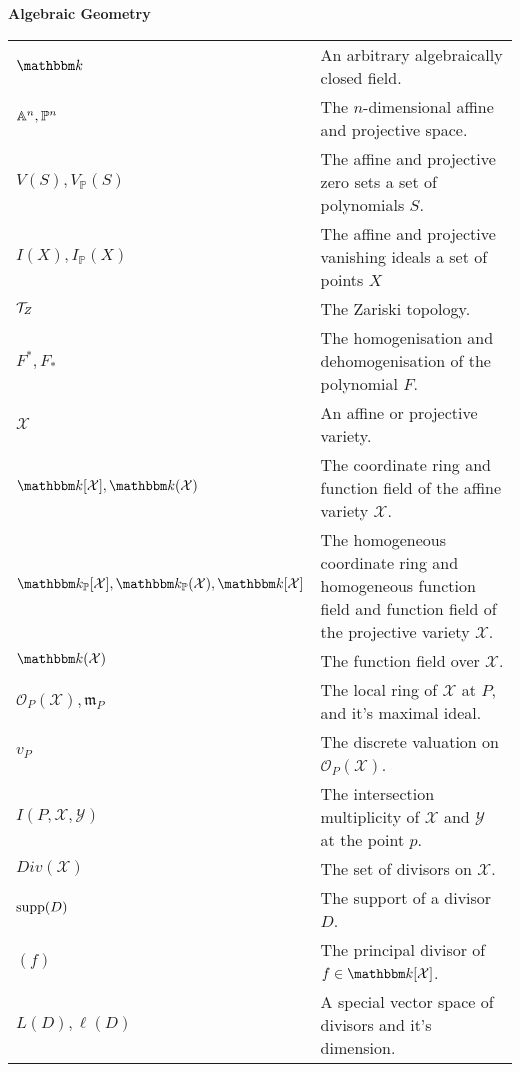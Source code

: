 \textbf{Algebraic Geometry}
\begin{table}[H]
    \begin{tabular}{ll}
      $\K$ & An arbitrary algebraically closed field. \\
      $\mathbb{A}^{n}, \mathbb{P}^{n}$ & The $n$-dimensional affine and projective space. \\
      $V(S), V_{\mathbb{P}}(S)$ & The affine and projective zero sets a set of polynomials $S$. \\
      $I(X), I_{\mathbb{P}}(X)$ & The affine and projective vanishing ideals a set of points $X$ \\
      $\mathcal{T}_Z$ & The Zariski topology. \\
      $F^{*}, F_{*}$ & The homogenisation and dehomogenisation of the polynomial $F$. \\
      $\mathcal{X}$ & An affine or projective variety. \\
      $\K[\mathcal{X}], \K(\mathcal{X})$ & The coordinate ring and function field of the affine variety $\mathcal{X}$. \\
      $\K_{\mathbb{P}}[\mathcal{X}], \K_{\mathbb{P}}(\mathcal{X}), \K[\mathcal{X}]$ & The homogeneous coordinate ring and homogeneous function field and function field of the projective variety $\mathcal{X}$. \\
      $\K(\mathcal{X})$ & The function field over $\mathcal{X}$. \\
      $\mathcal{O}_{P}(\mathcal{X}), \mathfrak{m}_{P}$ & The local ring of $\mathcal{X}$ at $P$, and it's maximal ideal. \\
      $v_P$ & The discrete valuation on $\mathcal{O}_{P}(\mathcal{X})$. \\
      $I(P, \mathcal{X}, \mathcal{Y})$ & The intersection multiplicity of $\mathcal{X}$ and $\mathcal{Y}$ at the point $p$. \\
      $Div(\mathcal{X})$ & The set of divisors on $\mathcal{X}$. \\
      $\textnormal{supp}(D)$ & The support of a divisor $D$. \\
      $(f)$ & The principal divisor of $f \in \K[\mathcal{X}]$. \\
      $L(D), \ell(D)$ & A special vector space of divisors and it's dimension. \\
    \end{tabular}
\end{table}

